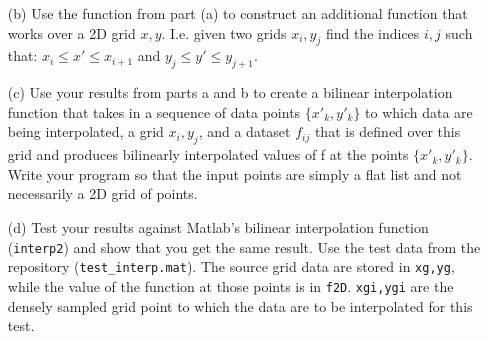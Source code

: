 \documentclass{article}
\begin{document}
\begin{enumerate}
\begin{itemize}
    \item[(b)]  Use the function from part (a) to construct an additional function that works over a 2D grid $x,y$.  I.e. given two grids $x_i,y_j$ find the indices $i,j$ such that:  $x_i \le x' \le x_{i+1}$ and $y_j \le y' \le y_{j+1}$.
    \item[(c)]  Use your results from parts a and b to create a bilinear interpolation function that takes in a sequence of data points $\{x'_k,y'_k\}$ to which data are being interpolated, a grid $x_i,y_j$, and a dataset $f_{ij}$ that is defined over this grid and produces bilinearly interpolated values of f at the points $\{x'_k,y'_k\}$.  Write your program so that the input points are simply a flat list and not necessarily a 2D grid of points.  
    \item[(d)]  Test your results against Matlab's bilinear interpolation function (\texttt{interp2}) and show that you get the same result.  Use the test data from the repository (\texttt{test\_interp.mat}).  The source grid data are stored in \texttt{xg,yg}, while the value of the function at those points is in \texttt{f2D}.  \texttt{xgi,ygi} are the densely sampled grid point to which the data are to be interpolated for this test.  
  \end{itemize} 
\end{enumerate}
\end{document}
